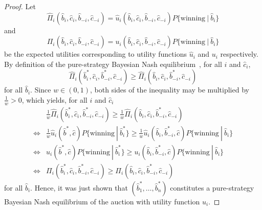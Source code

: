 \begin{proof}
Let
\begin{equation}
  \displaystyle\hat\Pi_i(\hat{b}_i,\hat{c}_i,\hat{b}_{-i},\hat{c}_{-i}) = \hat{u}_i(\hat{b}_i, \hat{c}_i, \hat{b}_{-i}, \hat{c}_{-i})P\{\textrm{winning}\:|\:\hat{b}_i\}
\end{equation}
and
\begin{equation}
  \displaystyle\Pi_i(\hat{b}_i,\hat{c}_i,\hat{b}_{-i},\hat{c}_{-i}) = u_i(\hat{b}_i, \hat{c}_i, \hat{b}_{-i}, \hat{c}_{-i})P\{\textrm{winning}\:|\:\hat{b}_i\}
\end{equation}
be the expected utilities corresponding to utility functions $\hat{u}_i$ and $u_i$ respectively. By definition of the pure-strategy Bayesian Nash equilibrium~\cite{Gibbons92}, for all $i$ and $\hat{c}_i$,
\begin{equation}
  \hat\Pi_i(\hat{b}_i^*,\hat{c}_i,\hat{b}_{-i}^*,\hat{c}_{-i})\geq \hat\Pi_i(\hat{b}_i,\hat{c}_i,\hat{b}_{-i}^*,\hat{c}_{-i})
\end{equation}
for all $\hat{b}_i$. Since $w\in(0,1)$, both sides of the inequality may be multiplied by $\frac{1}{w} > 0$, which yields, for all $i$ and $\hat{c}_i$
\begin{align}
  &\frac{1}{w}\hat\Pi_i(\hat{b}_i^*,\hat{c}_i,\hat{b}_{-i}^*,\hat{c}_{-i})\geq \frac{1}{w}\hat\Pi_i(\hat{b}_i,\hat{c}_i,\hat{b}_{-i}^*,\hat{c}_{-i}) \\\nonumber
  \iff &\frac{1}{w}\hat{u}_i(\hat{b}^*, \hat{c})P\{\textrm{winning}\:|\:\hat{b}_i^*\}\geq \frac{1}{w}\hat{u}_i(\hat{b}_i, \hat{b}_{-i}^*, \hat{c})P\{\textrm{winning}\:|\:\hat{b}_i\} \\\nonumber
  \iff &u_i(\hat{b}^*, \hat{c})P\{\textrm{winning}\:|\:\hat{b}_i^*\}\geq u_i(\hat{b}_i, \hat{b}_{-i}^*, \hat{c})P\{\textrm{winning}\:|\:\hat{b}_i\} \\\nonumber
  \iff &\Pi_i(\hat{b}_i^*,\hat{c}_i,\hat{b}_{-i}^*,\hat{c}_{-i})\geq \Pi_i(\hat{b}_i,\hat{c}_i,\hat{b}_{-i}^*,\hat{c}_{-i})
\end{align}
for all $\hat{b}_i$. Hence, it was just shown that $(\hat{b}_1^*,\ldots,\hat{b}_n^*)$ constitutes a pure-strategy Bayesian Nash equilibrium of the auction with utility function $u_i$.
\end{proof}

